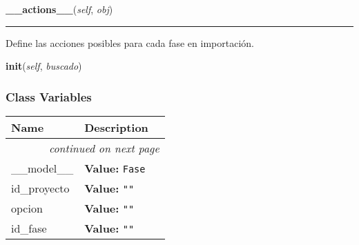 \hspace{.8\funcindent}\begin{boxedminipage}{\funcwidth}

    \raggedright \textbf{\_\_actions\_\_}(\textit{self}, \textit{obj})

    \vspace{-1.5ex}

    \rule{\textwidth}{0.5\fboxrule}
\setlength{\parskip}{2ex}
    Define las acciones posibles para cada fase en importación.

\setlength{\parskip}{1ex}
    \end{boxedminipage}

    \label{saip:controllers:fase_controller_2:FaseTableFiller:init}

    \vspace{0.5ex}

\hspace{.8\funcindent}\begin{boxedminipage}{\funcwidth}

    \raggedright \textbf{init}(\textit{self}, \textit{buscado})

\setlength{\parskip}{2ex}
\setlength{\parskip}{1ex}
    \end{boxedminipage}



  \subsubsection{Class Variables}

    \vspace{-1cm}
\hspace{\varindent}\begin{longtable}{|p{\varnamewidth}|p{\vardescrwidth}|l}
\cline{1-2}
\cline{1-2} \centering \textbf{Name} & \centering \textbf{Description}& \\
\cline{1-2}
\endhead\cline{1-2}\multicolumn{3}{r}{\small\textit{continued on next page}}\\\endfoot\cline{1-2}
\endlastfoot\raggedright \_\-\_\-m\-o\-d\-e\-l\-\_\-\_\- & \raggedright \textbf{Value:} 
{\tt Fase}&\\
\cline{1-2}
\raggedright i\-d\-\_\-p\-r\-o\-y\-e\-c\-t\-o\- & \raggedright \textbf{Value:} 
{\tt ""}&\\
\cline{1-2}
\raggedright o\-p\-c\-i\-o\-n\- & \raggedright \textbf{Value:} 
{\tt ""}&\\
\cline{1-2}
\raggedright i\-d\-\_\-f\-a\-s\-e\- & \raggedright \textbf{Value:} 
{\tt ""}&\\
\cline{1-2}
\end{longtable}

